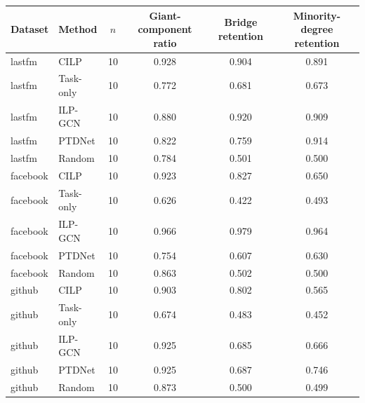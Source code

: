 \scriptsize
\begin{tabular}{@{}llcccc@{}}
\toprule
Dataset & Method & $n$ & Giant-component ratio & Bridge retention & Minority-degree retention \\
\midrule
lastfm & CILP & 10 & 0.928 & 0.904 & 0.891 \\
lastfm & Task-only & 10 & 0.772 & 0.681 & 0.673 \\
lastfm & ILP-GCN & 10 & 0.880 & 0.920 & 0.909 \\
lastfm & PTDNet & 10 & 0.822 & 0.759 & 0.914 \\
lastfm & Random & 10 & 0.784 & 0.501 & 0.500 \\
facebook & CILP & 10 & 0.923 & 0.827 & 0.650 \\
facebook & Task-only & 10 & 0.626 & 0.422 & 0.493 \\
facebook & ILP-GCN & 10 & 0.966 & 0.979 & 0.964 \\
facebook & PTDNet & 10 & 0.754 & 0.607 & 0.630 \\
facebook & Random & 10 & 0.863 & 0.502 & 0.500 \\
github & CILP & 10 & 0.903 & 0.802 & 0.565 \\
github & Task-only & 10 & 0.674 & 0.483 & 0.452 \\
github & ILP-GCN & 10 & 0.925 & 0.685 & 0.666 \\
github & PTDNet & 10 & 0.925 & 0.687 & 0.746 \\
github & Random & 10 & 0.873 & 0.500 & 0.499 \\
\bottomrule
\end{tabular}
